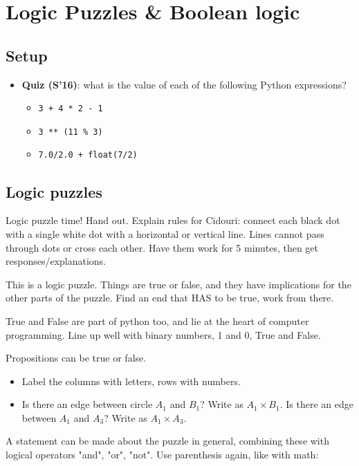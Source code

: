 \documentclass{article}
\begin{document}
\newpage
\section{Logic Puzzles \& Boolean logic}

\subsection*{Setup}
\begin{itemize}
\item \textbf{Quiz (S'16)}: what is the value of each of the following
  Python expressions?
  \begin{itemize}
  \item \verb|3 + 4 * 2 - 1|
  \item \verb|3 ** (11 % 3)|
  \item \verb|7.0/2.0 + float(7/2)|
  \end{itemize}
\end{itemize}

\subsection*{Logic puzzles}

Logic puzzle time!  Hand out. Explain rules for Cidouri: connect each
black dot with a single white dot with a horizontal or vertical line.
Lines cannot pass through dots or cross each other.  Have them work
for 5 minutes, then get responses/explanations.

This is a logic puzzle.  Things are true or false, and they have
implications for the other parts of the puzzle.  Find an end that HAS
to be true, work from there.

True and False are part of python too, and lie at the heart of
computer programming.  Line up well with binary numbers, 1 and 0, True
and False.

Propositions can be true or false.
\begin{itemize}
\item Label the columns with letters, rows with numbers.
\item Is there an edge between circle $A_1$ and $B_1$?  Write as $A_1
  \times B_1$. Is there an edge between $A_1$ and $A_3$? Write as $A_1
  \times A_3$.
\end{itemize}
A statement can be made about the puzzle in general, combining these
with logical operators "and", "or", "not".  Use parenthesis again, like
with math:

\newcommand{\orr}{\mathbin{\mathbf{or}}}
\newcommand{\andd}{\mathbin{\mathbf{and}}}
\newcommand{\nott}{\mathbin{\mathbf{not}}}
\end{document}
